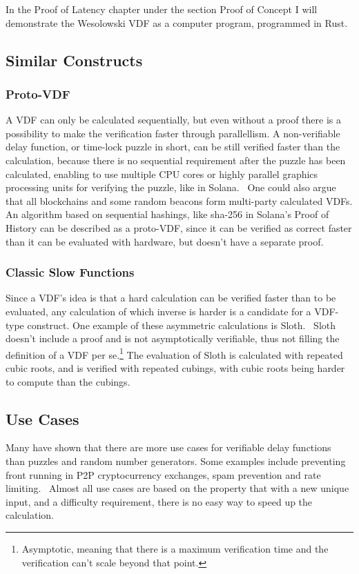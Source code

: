 In the Proof of Latency chapter under the section Proof of Concept I will demonstrate the Wesolowski VDF as a computer program, programmed in Rust.


\subsection{Similar Constructs}
\subsubsection{Proto-VDF}
A VDF can only be calculated sequentially, but even without a proof there is a possibility to make the verification faster through parallellism. A non-verifiable delay function, or time-lock puzzle in short, can be still verified faster than the calculation, because there is no sequential requirement after the puzzle has been calculated, enabling to use multiple CPU cores or highly parallel graphics processing units for verifying the puzzle, like in Solana.~\cite{Yakovenko2018-zn} One could also argue that all blockchains and some random beacons form multi-party calculated VDFs. An algorithm based on sequential hashings, like sha-256 in Solana's Proof of History can be described as a proto-VDF, since it can be verified as correct faster than it can be evaluated with hardware, but doesn't have a separate proof.

\subsubsection{Classic Slow Functions}
Since a VDF's idea is that a hard calculation can be verified faster than to be evaluated, any calculation of which inverse is harder is a candidate for a VDF-type construct. One example of these asymmetric calculations is Sloth.~\cite{Boneh2018-sm} Sloth doesn't include a proof and is not asymptotically verifiable, thus not filling the definition of a VDF per se.\footnote{Asymptotic, meaning that there is a maximum verification time and the verification can't scale beyond that point.} The evaluation of Sloth is calculated with repeated cubic roots, and is verified with repeated cubings, with cubic roots being harder to compute than the cubings.

\subsection{Use Cases}
Many have shown that there are more use cases for verifiable delay functions than puzzles and random number generators. Some examples include preventing front running in P2P cryptocurrency exchanges, spam prevention and rate limiting.~\cite{noauthor_undated-hk} Almost all use cases are based on the property that with a new unique input, and a difficulty requirement, there is no easy way to speed up the calculation.

